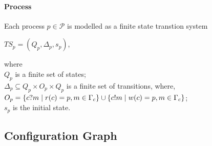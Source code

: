 \documentclass[a4paper,UKenglish,cleveref, autoref, thm-restate]{lipics-v2019}
\begin{document}
\paragraph*{Process}

Each process $p\in \mathcal{P}$ is modelled as a finite state transtion system 
\begin{center}
   $TS_p = (Q_p, \Delta_p, s_p)$,
\end{center}
where \\
\hspace*{1cm} $Q_p$ is a finite set of states;\\
\hspace*{1cm} $\Delta_p \subseteq Q_p \times O_p \times Q_p$ is a finite set of transitions, where, \\
\hspace*{2cm} $O_p = \{ c?m \hspace{1mm}| \hspace{1mm} r(c) = p,  m \in \Gamma_c\} \cup \{ c!m \hspace{1mm}| \hspace{1mm} w(c) = p, m \in \Gamma_c\}$; \\
\hspace*{1cm} $s_p$ is the initial state.



\subsection{Configuration Graph}
\end{document}
